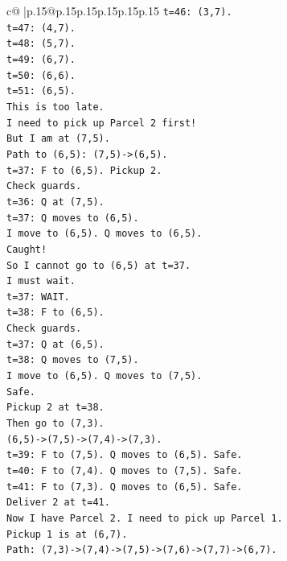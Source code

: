 \documentclass{article}
\begin{document}
{\begin{supertabular}{c@{$\;$}|p{.15\linewidth}@{}p{.15\linewidth}p{.15\linewidth}p{.15\linewidth}p{.15\linewidth}p{.15\linewidth}}
{{{\texttt{t=46: (3,7).} \\
\texttt{t=47: (4,7).} \\
\texttt{t=48: (5,7).} \\
\texttt{t=49: (6,7).} \\
\texttt{t=50: (6,6).} \\
\texttt{t=51: (6,5).} \\
\texttt{This is too late.} \\
\texttt{I need to pick up Parcel 2 first!} \\
\texttt{But I am at (7,5).} \\
\texttt{Path to (6,5): (7,5){-}>(6,5).} \\
\texttt{t=37: F to (6,5). Pickup 2.} \\
\texttt{Check guards.} \\
\texttt{t=36: Q at (7,5).} \\
\texttt{t=37: Q moves to (6,5).} \\
\texttt{I move to (6,5). Q moves to (6,5).} \\
\texttt{Caught!} \\
\texttt{So I cannot go to (6,5) at t=37.} \\
\texttt{I must wait.} \\
\texttt{t=37: WAIT.} \\
\texttt{t=38: F to (6,5).} \\
\texttt{Check guards.} \\
\texttt{t=37: Q at (6,5).} \\
\texttt{t=38: Q moves to (7,5).} \\
\texttt{I move to (6,5). Q moves to (7,5).} \\
\texttt{Safe.} \\
\texttt{Pickup 2 at t=38.} \\
\texttt{Then go to (7,3).} \\
\texttt{(6,5){-}>(7,5){-}>(7,4){-}>(7,3).} \\
\texttt{t=39: F to (7,5). Q moves to (6,5). Safe.} \\
\texttt{t=40: F to (7,4). Q moves to (7,5). Safe.} \\
\texttt{t=41: F to (7,3). Q moves to (6,5). Safe.} \\
\texttt{Deliver 2 at t=41.} \\
\texttt{Now I have Parcel 2. I need to pick up Parcel 1.} \\
\texttt{Pickup 1 is at (6,7).} \\
\texttt{Path: (7,3){-}>(7,4){-}>(7,5){-}>(7,6){-}>(7,7){-}>(6,7).} \\
}}}
\end{supertabular}}
\end{document}
